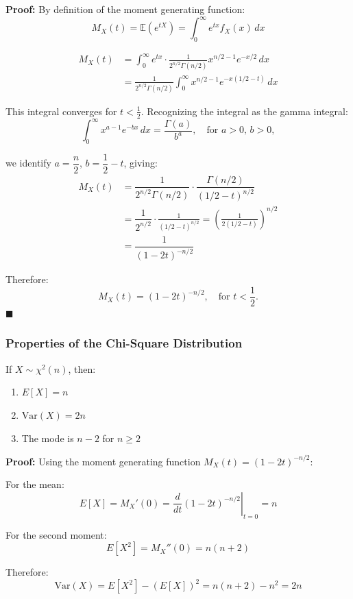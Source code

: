 \documentclass[twoside]{book}
\begin{document}
\textbf{Proof:} By definition of the moment generating function:
\[
M_X(t) = \mathbb{E}\left( e^{tX}\right)  = \int_0^\infty e^{tx} f_X(x) \, dx
\]

\begin{align*}
M_X(t) &= \int_0^\infty e^{tx} \cdot \frac{1}{2^{n/2} \Gamma(n/2)} x^{n/2 - 1} e^{-x/2} \, dx\\
&= \frac{1}{2^{n/2} \Gamma(n/2)} \int_0^\infty x^{n/2 - 1} e^{-x(1/2 - t)} \, dx
\end{align*}


This integral converges for \( t < \frac{1}{2} \). Recognizing the integral as the gamma integral:
\[
\int_0^\infty x^{a - 1} e^{-bx} \, dx = \dfrac{\Gamma(a)}{b^a}, \quad \text{for } a > 0,\, b > 0,
\]

we identify \( a = \dfrac{n}{2} \), \( b = \dfrac{1}{2} - t \), giving:
\begin{align*}
M_X(t) &= \dfrac{1}{2^{n/2} \Gamma(n/2)} \cdot \dfrac{\Gamma(n/2)}{(1/2 - t)^{n/2}}\\
&= \dfrac{1}{2^{n/2}} \cdot \frac{1}{(1/2 - t)^{n/2}} = \left( \frac{1}{2(1/2 - t)} \right)^{n/2}\\
&=\dfrac{1}{(1 - 2t)^{-n/2}}
\end{align*}

Therefore:
\[
M_X(t) = (1 - 2t)^{-n/2}, \quad \text{for } t < \frac{1}{2}.
\]
\hfill $\blacksquare$


\subsubsection{Properties of the Chi-Square Distribution}

\begin{textbox}
If $X \sim \chi^2(n)$, then:
\begin{enumerate}
\item $E[X] = n$
\item $\text{Var}(X) = 2n$
\item The mode is $n-2$ for $n \geq 2$
\end{enumerate}
\end{textbox}

\textbf{Proof:} Using the moment generating function $M_X(t) = (1-2t)^{-n/2}$:

For the mean:
$$E[X] = M_X'(0) = \left.\frac{d}{dt}(1-2t)^{-n/2}\right|_{t=0} = n$$

For the second moment:
$$E[X^2] = M_X''(0) = n(n+2)$$

Therefore:
$$\text{Var}(X) = E[X^2] - (E[X])^2 = n(n+2) - n^2 = 2n$$
\end{document}
